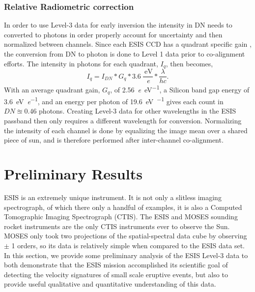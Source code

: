           \subsubsection{Relative Radiometric correction }	 
   	In order to use Level-3 data for early inversion the intensity in DN needs to  converted to photons in order properly account for uncertainty and then normalized between channels.
   		Since each ESIS CCD has a quadrant specific gain \citep{ESIS}, the conversion from DN to photon is done to Level 1 data prior to co-alignment efforts.
   		The intensity in photons for each quadrant, $I_q$, then becomes,
   		\begin{equation}
	   		I_q = I_{DN} * G_q * 3.6\ \frac{\SI{}{\electronvolt}}{\SI{}{\elementarycharge}} * \frac{\lambda}{hc}.
   		\end{equation}
		With an average quadrant gain, $G_q$, of \SI[per-mode=symbol]{2.56}{\elementarycharge\per\electronvolt}, a Silicon band gap energy of \SI[per-mode=symbol]{3.6}{\electronvolt\per\elementarycharge}, and an energy per \ov photon of \SI[per-mode=symbol]{19.6}{\electronvolt\per\photon} gives each count in $DN \approxeq 0.46$ photons.
		Creating Level-3 data for other wavelengths in the ESIS passband then only requires a different wavelength for conversion.
   		Normalizing the intensity of each channel is done by equalizing the image mean over a shared piece of sun, and is therefore performed after inter-channel co-alignment. 
  

\section{Preliminary Results}

	   ESIS is an extremely unique instrument.  It is not only a slitless imaging spectrograph, of which there only a handful of examples, it is also a Computed Tomographic Imaging Spectrograph (CTIS).  The ESIS and MOSES sounding rocket instruments are the only CTIS instruments ever to observe the Sun. MOSES only took two projections of the spatial-spectral data cube by observing $\pm$ 1 orders, so its data is relatively simple when compared to the ESIS data set.   In this section, we provide some preliminary analysis of the ESIS Level-3 data to both demonstrate that the ESIS mission accomplished its scientific goal of detecting the velocity signatures of small scale eruptive events, but also to provide useful qualitative and quantitative understanding of this data.  
		
